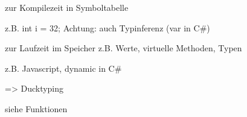 %
%
 zur Kompilezeit in Symboltabelle

z.B. int i = 32;  
Achtung: auch Typinferenz (var in C\#)

 zur Laufzeit im Speicher z.B. Werte, virtuelle Methoden, Typen

z.B. Javascript, dynamic in C\# 

=> Ducktyping

 siehe Funktionen

%
%

